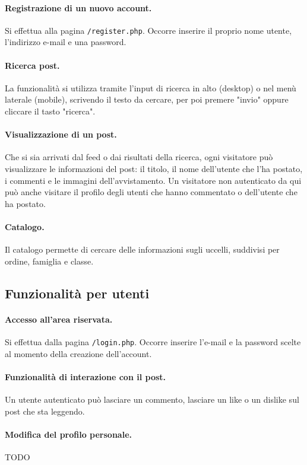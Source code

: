 \documentclass[12pt, a4paper]{article}
\begin{document}
\paragraph{Registrazione di un nuovo account.} Si effettua alla pagina \texttt{/register.php}. Occorre inserire il proprio nome utente, l'indirizzo e-mail e una password.
\paragraph{Ricerca post.} La funzionalità si utilizza tramite l'input di ricerca in alto (desktop) o nel menù laterale (mobile), scrivendo il testo da cercare, per poi premere "invio" oppure cliccare il tasto "ricerca".  
\paragraph{Visualizzazione di un post.} Che si sia arrivati dal feed o dai risultati della ricerca, ogni visitatore può visualizzare le informazioni del post: il titolo, il nome dell'utente che l'ha postato, i commenti e le immagini dell'avvistamento. Un visitatore non autenticato da qui può anche visitare il profilo degli utenti che hanno commentato o dell'utente che ha postato.
\paragraph{Catalogo.} Il catalogo permette di cercare delle informazioni sugli uccelli, suddivisi per ordine, famiglia e classe.
\subsection{Funzionalità per utenti}
\paragraph{Accesso all'area riservata.} 
Si effettua dalla pagina \texttt{/login.php}. Occorre inserire l'e-mail e la password scelte al momento della creazione dell'account. 
\paragraph{Funzionalità di interazione con il post.} Un utente autenticato può lasciare un commento, lasciare un like o un dislike sul post che sta leggendo.
\paragraph{Modifica del profilo personale.} TODO
\end{document}
